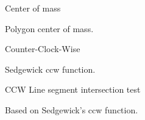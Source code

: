 \begin{algorithm}{Center of mass}

Polygon center of mass.
\end{algorithm}

\begin{algorithm}{Counter-Clock-Wise}

Sedgewick ccw function.
\end{algorithm}

\begin{algorithm}{CCW Line segment intersection test}

Based on Sedgewick's ccw function.
\end{algorithm}
